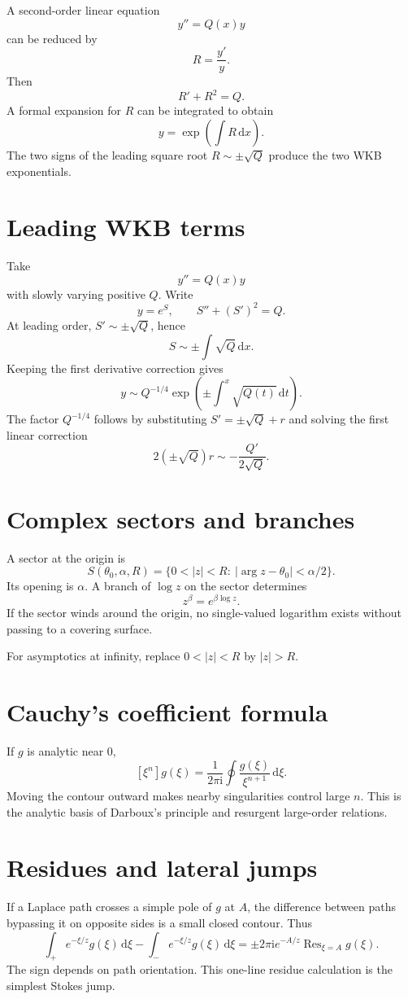 \documentclass[11pt,openany]{book}
\theoremstyle{definition}
\theoremstyle{plain}
\theoremstyle{remark}
\newcommand{\dd}{\,\mathrm{d}}
\newcommand{\ii}{\mathrm{i}}
\newcommand{\asym}{\sim}
\DeclareMathOperator{\Res}{Res}
\begin{document}
A second-order linear equation
\[
 y''=Q(x)y
\]
can be reduced by
\[
 R=\frac{y'}y.
\]
Then
\[
 R'+R^2=Q.
\]
A formal expansion for $R$ can be integrated to obtain
\[
 y=\exp\left(\int R\dd x\right).
\]
The two signs of the leading square root $R\sim\pm\sqrt Q$ produce the two WKB exponentials.

\section{Leading WKB terms}

Take
\[
 y''=Q(x)y
\]
with slowly varying positive $Q$. Write
\[
 y=e^{S},
 \qquad
 S''+(S')^2=Q.
\]
At leading order, $S'\sim\pm\sqrt Q$, hence
\[
 S\sim\pm\int\sqrt Q\dd x.
\]
Keeping the first derivative correction gives
\[
 y\asym Q^{-1/4}
 \exp\left(\pm\int^x\sqrt{Q(t)}\dd t\right).
\]
The factor $Q^{-1/4}$ follows by substituting $S'=\pm\sqrt Q+r$ and solving the first linear correction
\[
 2(\pm\sqrt Q)r\sim-\frac{Q'}{2\sqrt Q}.
\]

\section{Complex sectors and branches}

A sector at the origin is
\[
 S(\theta_0,\alpha,R)
 =\{0<|z|<R:\ |\arg z-\theta_0|<\alpha/2\}.
\]
Its opening is $\alpha$. A branch of $\log z$ on the sector determines
\[
 z^\beta=e^{\beta\log z}.
\]
If the sector winds around the origin, no single-valued logarithm exists without passing to a covering surface.

For asymptotics at infinity, replace $0<|z|<R$ by $|z|>R$.

\section{Cauchy's coefficient formula}

If $g$ is analytic near $0$,
\[
 [\xi^n]g(\xi)
 =\frac1{2\pi\ii}\oint
 \frac{g(\xi)}{\xi^{n+1}}\dd\xi.
\]
Moving the contour outward makes nearby singularities control large $n$. This is the analytic basis of Darboux's principle and resurgent large-order relations.

\section{Residues and lateral jumps}

If a Laplace path crosses a simple pole of $g$ at $A$, the difference between paths bypassing it on opposite sides is a small closed contour. Thus
\[
 \int_{+}e^{-\xi/z}g(\xi)\dd\xi
 -\int_{-}e^{-\xi/z}g(\xi)\dd\xi
 =\pm2\pi\ii e^{-A/z}\Res_{\xi=A}g(\xi).
\]
The sign depends on path orientation. This one-line residue calculation is the simplest Stokes jump.
\end{document}
